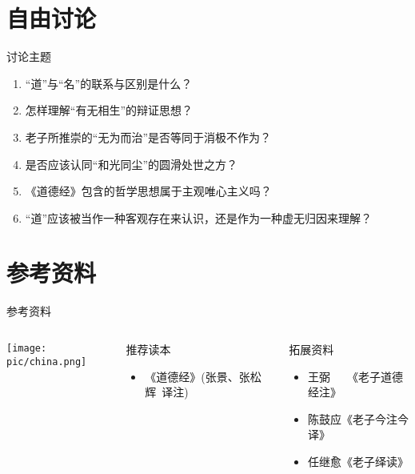 \documentclass{beamer}
\begin{document}
\section{自由讨论}
\begin{frame}{讨论主题}
	\begin{enumerate} %
		\item \alert{“道”}与\alert{“名”}的联系与区别是什么？
		\item 怎样理解\alert{“有无相生”}的辩证思想？
		\item 老子所推崇的\alert{“无为而治”}是否等同于消极不作为？
		\item 是否应该认同\alert{“和光同尘”}的圆滑处世之方？
		\item 《道德经》包含的哲学思想属于\alert{主观唯心主义}吗？
		\item “道”应该被当作一种\alert{客观存在}来认识，还是作为一种\alert{虚无归因}来理解？
    \end{enumerate}
\end{frame}


\section{参考资料}
\begin{frame}{参考资料}
	\begin{columns}%
	\centering
		\begin{center}  %
			\texttt{[image: pic/china.png]}
		\end{center}

	\begin{exampleblock}{推荐读本}
		\begin{itemize}
			\item {《道德经》(张景、张松辉\ 译注)}
		\end{itemize}
	\end{exampleblock}
    
	\begin{exampleblock}{拓展资料}
		\begin{itemize}
			\item 王弼\ \ \ 《老子道德经注》
			\item 陈鼓应《老子今注今译》
			\item 任继愈《老子绎读》
      \end{itemize}
    \end{exampleblock}
    	 \vspace{0.5 cm}
  \end{columns}
\end{frame}
\end{document}
